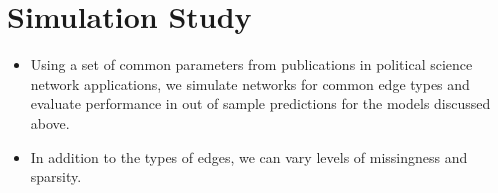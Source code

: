 \documentclass[fleqn,12pt]{wlscirep}
\begin{document}
\section*{Simulation Study}

\begin{itemize}
\item Using a set of common parameters from publications in political science network applications, we simulate networks for common edge types and evaluate performance in out of sample predictions for the models discussed above.
\item In addition to the types of edges, we can vary levels of missingness and sparsity.

\end{itemize}

\newpage


\end{document}
